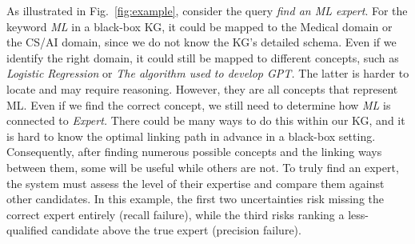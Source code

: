 \begin{exmp}
As illustrated in Fig.~\ref{fig:example}, consider the query \textit{find an ML expert}. For the keyword \textit{ML} in a black-box KG, it could be mapped to the Medical domain or the CS/AI domain, since we do not know the KG's detailed schema. Even if we identify the right domain, it could still be mapped to different concepts, such as \textit{Logistic Regression} or \textit{The algorithm used to develop GPT.} The latter is harder to locate and may require reasoning. However, they are all concepts that represent ML. Even if we find the correct concept, we still need to determine how \textit{ML} is connected to \textit{Expert.} There could be many ways to do this within our KG, and it is hard to know the optimal linking path in advance in a black-box setting. Consequently, after finding numerous possible concepts and the linking ways between them, some will be useful while others are not. To truly find an expert, the system must assess the level of their expertise and compare them against other candidates. In this example, the first two uncertainties risk missing the correct expert entirely (recall failure), while the third risks ranking a less-qualified candidate above the true expert (precision failure).
\end{exmp}


